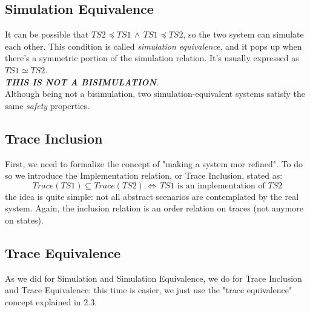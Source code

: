 \documentclass{article}
\begin{document}
	 		\subsection{Simulation Equivalence}
	 			It can be possible that $TS2 \preceq TS1 \,\wedge\, TS1 \preceq TS2$, so the two system can simulate each other. This condition is called \emph{simulation equivalence}, and it pops up when there's a symmetric portion of the simulation relation. It's usually expressed as $TS1 \simeq TS2$.\\
	 			\textbf{\emph{THIS IS NOT A BISIMULATION}}.\\
	 			Although being not a bisimulation, two simulation-equivalent systems satisfy the same \emph{safety} properties.
			
			\subsection{Trace Inclusion}
				First, we need to formalize the concept of "making a system mor refined". To do so we introduce the Implementation relation, or Trace Inclusion, stated as:
				\begin{equation}
					Trace(TS1) \subseteq Trace(TS2) \,\Leftrightarrow\, TS1 \text{ is an implementation of } TS2
				\end{equation}
				the idea is quite simple: not all abstract scenarios are contemplated by the real system. Again, the inclusion relation is an order relation on traces (not anymore on states).
				
			\subsection{Trace Equivalence}
				As we did for Simulation and Simulation Equivalence, we do for Trace Inclusion and Trace Equivalence: this time is easier, we just use the "trace equivalence" concept explained in 2.3.
				
\end{document}
